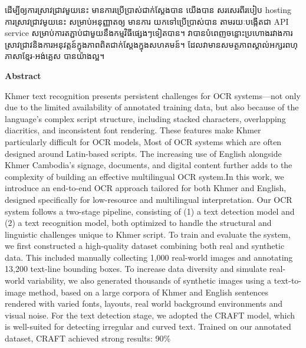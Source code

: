 \begin{adjustwidth}{0.2cm}{0.2cm}
    ដើម្បីឲ្យការស្រាវជ្រាវមួយនេះ មានការប្រើប្រាស់ជាក់ស្ដែងបាន យើងបាន សរសេរពីរបៀប 
    hosting ការស្រាវជ្រាវមូយនេះ សម្រាប់អនុញ្ញាតឲ្យ មានការ យកទៅប្រើប្រាស់បាន 
    តាមរយៈបង្កើតជា API service សម្រាប់ការតភ្ជាប់ជាមួយនឹងកម្មវិធីផ្សេងៗទៀតបាន។ 
    វាបានបំពេញចន្លោះប្រហោងរវាងការស្រាវជ្រាវនិងការអនុវត្តន៍ក្នុងភាពពិតជាក់ស្ដែងក្នុងសហគមន៍។
    ដែលវាមានសមត្ថភាពស្គាល់អក្សរពហុភាសាខ្មែរ-អង់គ្លេស បានយ៉ាងល្អ។   
    \vspace{2cm}
    
    \begin{center}
        {\bfseries\LARGE Abstract \par}
    \end{center}
    \label{abstract}
    \vspace{0.5cm}
    \englishfont
    \large
    Khmer text recognition presents persistent challenges for OCR 
    systems—not only due to the limited availability of annotated 
    training data, but also because of the language's complex script 
    structure, including stacked characters, overlapping diacritics, 
    and inconsistent font rendering. These features make Khmer 
    particularly difficult for OCR models, Most of OCR systems which 
    are often designed around Latin-based scripts. The increasing 
    use of English alongside Khmer Cambodia’s signage, documents, 
    and digital content further adds to the complexity of building 
    an effective multilingual OCR system.In this work, we introduce an end-to-end OCR approach tailored 
    for both Khmer and English, designed specifically for 
    low-resource and multilingual interpretation. Our OCR system 
    follows a two-stage pipeline, consisting of (1) a text detection 
    model and (2) a text recognition model, both optimized to handle 
    the structural and linguistic challenges unique to Khmer script.
    To train and evaluate the system, we first constructed a 
    high-quality dataset combining both real and synthetic data. 
    This included manually collecting 1,000 real-world images and 
    annotating 13,200 text-line bounding boxes. To increase data 
    diversity and simulate real-world variability, we also generated 
    thousands of synthetic images using a text-to-image method, 
    based on a large corpora of Khmer and English sentences rendered 
    with varied fonts, layouts, real world background environments 
    and visual noise.
    For the text detection stage, we adopted the CRAFT model, which 
    is well-suited for detecting irregular and curved text. Trained 
    on our annotated dataset, CRAFT achieved strong results: 90\% 

\end{adjustwidth}
